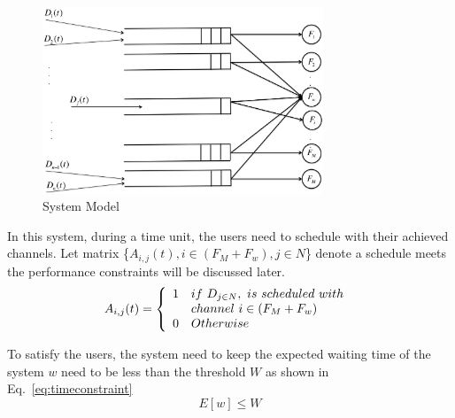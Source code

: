 




\begin{figure}
\vspace{-0.0in}
\centering
\includegraphics[width=84mm]{figures/flowconfig}
\vspace{-0.1in}
\caption{System Model}
\label{fig:flowconfig}
\vspace{-0.1in}
\end{figure}


In this system, during a time unit, the users need to schedule with their achieved channels. 
Let matrix \{$A_{i,j}(t),i\in (F_M+F_w), j\in N$\} denote a schedule meets the performance constraints 
will be discussed later.
\begin{equation}
\label{eq:associate_def}
 A_{i,j}(t) = \left\{ 
	  \begin{array}{l l}
	    1   &  if\ D_{j\in N},\ is\ scheduled\ with\ \\
		& channel\ i \in (F_M+F_w) \\
		0 &  Otherwise
			    \end{array} \right.
\end{equation}


To satisfy the users, the system need to keep the expected waiting time of the system $w$ need to be less than the 
threshold $W$ as shown in Eq.~\ref{eq:timeconstraint}
\begin{equation}
\label{eq:timeconstraint}
E[w]\le W
\end{equation}


